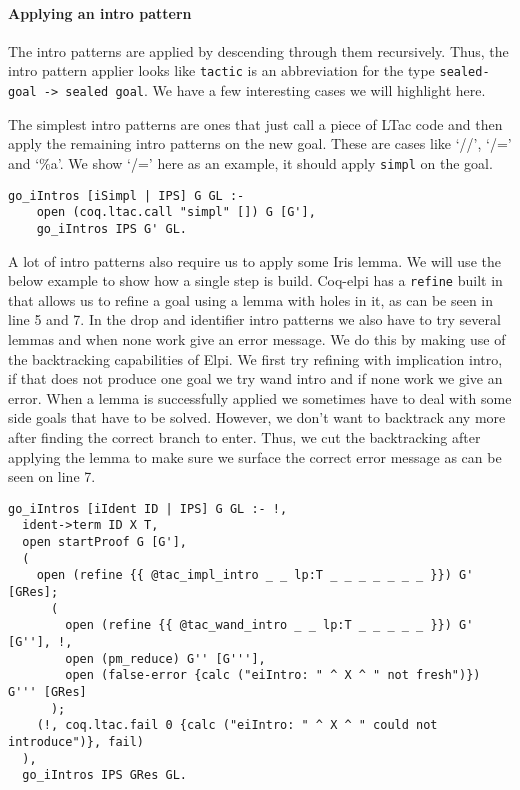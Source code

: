 \documentclass[thesis.tex]{subfiles}
\begin{document}
\paragraph*{Applying an intro pattern}
The intro patterns are applied by descending through them recursively. Thus, the intro pattern applier looks like  \texttt{tactic} is an abbreviation for the type \texttt{sealed-goal -> sealed goal}. We have a few interesting cases we will highlight here.

The simplest intro patterns are ones that just call a piece of LTac code and then apply the remaining intro patterns on the new goal. These are cases like `//', `/=' and `\%a'. We show `/=' here as an example, it should apply \texttt{simpl} on the goal.
\begin{verbatim}
go_iIntros [iSimpl | IPS] G GL :-
    open (coq.ltac.call "simpl" []) G [G'],
    go_iIntros IPS G' GL.
\end{verbatim}

A lot of intro patterns also require us to apply some Iris lemma. We will use the below example to show how a single step is build. Coq-elpi has a \texttt{refine} built in that allows us to refine a goal using a lemma with holes in it, as can be seen in line 5 and 7. In the drop and identifier intro patterns we also have to try several lemmas and when none work give an error message. We do this by making use of the backtracking capabilities of Elpi. We first try refining with implication intro, if that does not produce one goal we try wand intro and if none work we give an error. When a lemma is successfully applied we sometimes have to deal with some side goals that have to be solved. However, we don't want to backtrack any more after finding the correct branch to enter. Thus, we cut the backtracking after applying the lemma to make sure we surface the correct error message as can be seen on line 7.
\begin{verbatim}
go_iIntros [iIdent ID | IPS] G GL :- !,
  ident->term ID X T,
  open startProof G [G'],
  (
    open (refine {{ @tac_impl_intro _ _ lp:T _ _ _ _ _ _ _ }}) G' [GRes];
      (
        open (refine {{ @tac_wand_intro _ _ lp:T _ _ _ _ _ }}) G' [G''], !,
        open (pm_reduce) G'' [G'''],
        open (false-error {calc ("eiIntro: " ^ X ^ " not fresh")}) G''' [GRes]
      );
    (!, coq.ltac.fail 0 {calc ("eiIntro: " ^ X ^ " could not introduce")}, fail)
  ),
  go_iIntros IPS GRes GL.
\end{verbatim}
\end{document}
